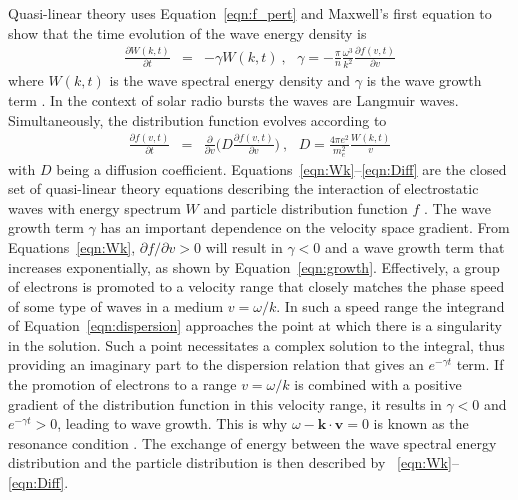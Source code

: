 Quasi-linear theory uses Equation~\ref{eqn:f_pert} and Maxwell's first equation to show that the time evolution of the wave energy density is
\begin{eqnarray}
\frac{\partial W(k,t)}{\partial t} &=& -\gamma W(k,t)~,~~~\gamma = -\frac{\pi}{n}\frac{\omega^3}{k^2} \frac{\partial f(v,t)}{\partial v}
\label{eqn:Wk}
\end{eqnarray}
where $W(k,t)$ is the wave spectral energy density and $\gamma$ is the wave growth term \citep{vedenov1963}. In the context of solar radio bursts the waves are Langmuir waves.
Simultaneously, the distribution function evolves according to 
\begin{eqnarray}
\frac{\partial f(v,t)}{\partial t} &=& \frac{\partial }{\partial v} \bigg(D\frac{\partial f(v,t)}{\partial v}\bigg)~,~~~D = \frac{4\pi e^2}{m_e^2}\frac{W(k,t)}{v}
\label{eqn:Diff}
\end{eqnarray}
with $D$ being a diffusion coefficient. Equations~\ref{eqn:Wk}--\ref{eqn:Diff} are the closed set of quasi-linear theory equations describing the interaction of electrostatic waves with energy spectrum $W$ and particle distribution function $f$ \citep{vedenov1963, kontar2001}. The wave growth term $\gamma$ has an important dependence on the velocity space gradient. From Equations~\ref{eqn:Wk}, $\partial f/\partial v >0$ will result in $\gamma <0$ and a wave growth term that increases exponentially, as shown by Equation~\ref{eqn:growth}. Effectively, a group of electrons is promoted to a velocity range that closely matches the phase speed of some type of waves in a medium $v = \omega/k$. In such a speed range the integrand of Equation~\ref{eqn:dispersion} approaches the point at which there is a singularity in the solution. Such a point necessitates a complex solution to the integral, thus providing an imaginary part to the dispersion relation that gives an $e^{-\gamma t}$ term. If the promotion of electrons to a range $v = \omega/k$ is combined with a positive gradient of the distribution function in this velocity range, it results in $\gamma < 0$ and $e^{-\gamma t}>0$, leading to wave growth. This is why $\omega - \mathbf{k\cdot v}=0$ is known as the resonance condition \citep{melrose1989}. The exchange of energy between the wave spectral energy distribution and the particle distribution is then described by ~\ref{eqn:Wk}--\ref{eqn:Diff}.

